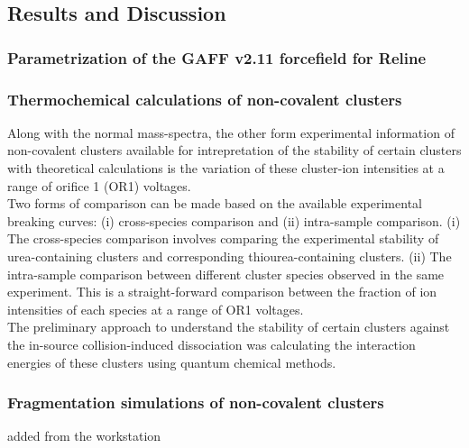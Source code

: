 \subsection*{Results and Discussion}
\subsubsection*{Parametrization of the GAFF v2.11 forcefield for Reline}
\subsubsection*{Thermochemical calculations of non-covalent clusters}
Along with the normal mass-spectra, the other form experimental information of non-covalent clusters available for intrepretation of the stability of certain clusters with theoretical calculations is the variation of these cluster-ion intensities at a range of orifice 1 (OR1) voltages.
 \\ Two forms of comparison can be made based on the available experimental breaking curves: (i) cross-species comparison and (ii) intra-sample comparison. (i) The cross-species comparison involves comparing the experimental stability of urea-containing clusters and corresponding thiourea-containing clusters. (ii) The intra-sample comparison between different cluster species observed in the same experiment. This is a straight-forward comparison between the fraction of ion intensities of each species at a range of OR1 voltages.
\\
 The preliminary approach to understand the stability of certain clusters against the in-source collision-induced dissociation was calculating the interaction energies of these clusters using quantum chemical methods. \\

\subsubsection*{Fragmentation simulations of non-covalent clusters}
added from the workstation